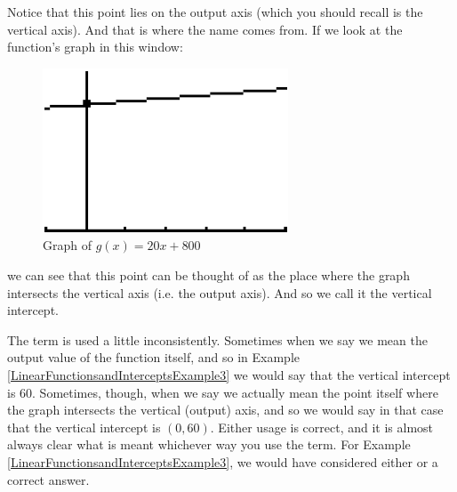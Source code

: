 Notice that this point lies on the output axis (which you should recall is the vertical axis). And that is where the name comes from. If we look at the function’s graph in this window:

\begin{figure}[H]
	\centering
	\includegraphics[scale=1.0]{Sections/LinearFunctionsandInterceptsImages/Figure02.png}
	\caption{Graph of $g(x)=20x+800$}
\end{figure}

we can see that this point can be thought of as the place where the graph intersects the vertical axis (i.e. the output axis). And so we call it the vertical intercept.



\bigskip

The term  is used a little inconsistently. Sometimes when we say  we mean the output value of the function itself, and so in Example \ref{LinearFunctionsandInterceptsExample3} we would say that the vertical intercept is 60. Sometimes, though, when we say  we actually mean the point itself where the graph intersects the vertical (output) axis, and so we would say in that case that the vertical intercept is $(0,60)$. Either usage is correct, and it is almost always clear what is meant whichever way you use the term. For Example \ref{LinearFunctionsandInterceptsExample3}, we would have considered either  or  a correct answer.

